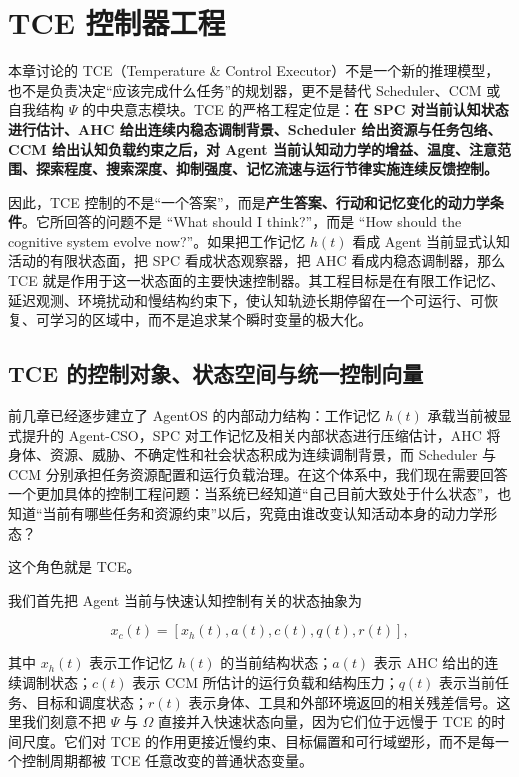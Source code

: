 \chapter{TCE 控制器工程}

\begin{chapterlead}
本章讨论的 TCE（Temperature \& Control Executor）不是一个新的推理模型，也不是负责决定“应该完成什么任务”的规划器，更不是替代 Scheduler、CCM 或自我结构 $\Psi$ 的中央意志模块。TCE 的严格工程定位是：\textbf{在 SPC 对当前认知状态进行估计、AHC 给出连续内稳态调制背景、Scheduler 给出资源与任务包络、CCM 给出认知负载约束之后，对 Agent 当前认知动力学的增益、温度、注意范围、探索程度、搜索深度、抑制强度、记忆流速与运行节律实施连续反馈控制。}

因此，TCE 控制的不是“一个答案”，而是\textbf{产生答案、行动和记忆变化的动力学条件}。它所回答的问题不是 ``What should I think?''，而是 ``How should the cognitive system evolve now?''。如果把工作记忆 $h(t)$ 看成 Agent 当前显式认知活动的有限状态面，把 SPC 看成状态观察器，把 AHC 看成内稳态调制器，那么 TCE 就是作用于这一状态面的主要快速控制器。其工程目标是在有限工作记忆、延迟观测、环境扰动和慢结构约束下，使认知轨迹长期停留在一个可运行、可恢复、可学习的区域中，而不是追求某个瞬时变量的极大化。
\end{chapterlead}


\section{TCE 的控制对象、状态空间与统一控制向量}

前几章已经逐步建立了 AgentOS 的内部动力结构：工作记忆 $h(t)$ 承载当前被显式提升的 Agent-CSO，SPC 对工作记忆及相关内部状态进行压缩估计，AHC 将身体、资源、威胁、不确定性和社会状态积成为连续调制背景，而 Scheduler 与 CCM 分别承担任务资源配置和运行负载治理。在这个体系中，我们现在需要回答一个更加具体的控制工程问题：当系统已经知道“自己目前大致处于什么状态”，也知道“当前有哪些任务和资源约束”以后，究竟由谁改变认知活动本身的动力学形态？

这个角色就是 TCE。

我们首先把 Agent 当前与快速认知控制有关的状态抽象为

\[
x_c(t)
=
\left[
x_h(t),
a(t),
c(t),
q(t),
r(t)
\right],
\]

其中 $x_h(t)$ 表示工作记忆 $h(t)$ 的当前结构状态；$a(t)$ 表示 AHC 给出的连续调制状态；$c(t)$ 表示 CCM 所估计的运行负载和结构压力；$q(t)$ 表示当前任务、目标和调度状态；$r(t)$ 表示身体、工具和外部环境返回的相关残差信号。这里我们刻意不把 $\Psi$ 与 $\Omega$ 直接并入快速状态向量，因为它们位于远慢于 TCE 的时间尺度。它们对 TCE 的作用更接近慢约束、目标偏置和可行域塑形，而不是每一个控制周期都被 TCE 任意改变的普通状态变量。

